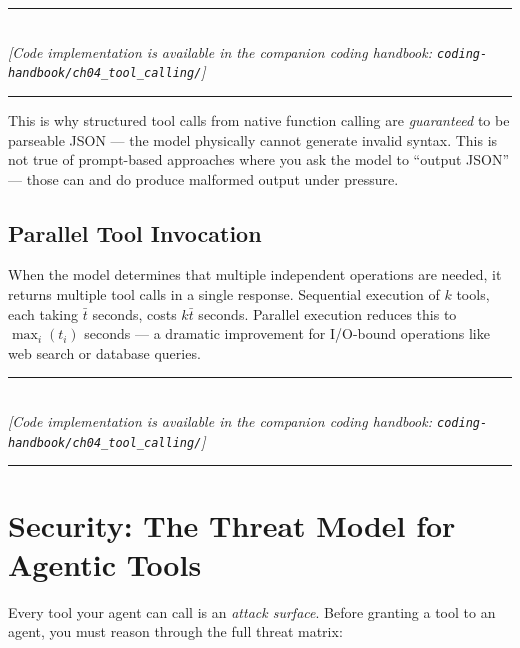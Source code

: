 \begin{center}
\noindent\rule{0.6\textwidth}{0.4pt} \\
\vspace{0.3em}
\textit{[Code implementation is available in the companion coding handbook: \texttt{coding-handbook/ch04\_tool\_calling/}]} \\
\noindent\rule{0.6\textwidth}{0.4pt}
\end{center}


This is why structured tool calls from native function calling are \textit{guaranteed} to be parseable JSON — the model physically cannot generate invalid syntax. This is not true of prompt-based approaches where you ask the model to ``output JSON'' — those can and do produce malformed output under pressure.

\subsection{Parallel Tool Invocation}
When the model determines that multiple independent operations are needed, it returns multiple tool calls in a single response. Sequential execution of $k$ tools, each taking $\bar{t}$ seconds, costs $k\bar{t}$ seconds. Parallel execution reduces this to $\max_i(t_i)$ seconds — a dramatic improvement for I/O-bound operations like web search or database queries.


\begin{center}
\noindent\rule{0.6\textwidth}{0.4pt} \\
\vspace{0.3em}
\textit{[Code implementation is available in the companion coding handbook: \texttt{coding-handbook/ch04\_tool\_calling/}]} \\
\noindent\rule{0.6\textwidth}{0.4pt}
\end{center}


\section{Security: The Threat Model for Agentic Tools}

Every tool your agent can call is an \textit{attack surface}. Before granting a tool to an agent, you must reason through the full threat matrix:

